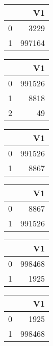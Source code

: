 \bigskip\bigskip
\centering
\begin{tabular}{rr}
  \hline
 & V1 \\ 
  \hline
0 & 3229 \\ 
  1 & 997164 \\ 
   \hline
\end{tabular}

\bigskip\bigskip
\centering
\begin{tabular}{rr}
  \hline
 & V1 \\ 
  \hline
0 & 991526 \\ 
  1 & 8818 \\ 
  2 &  49 \\ 
   \hline
\end{tabular}

\bigskip\bigskip
\centering
\begin{tabular}{rr}
  \hline
 & V1 \\ 
  \hline
0 & 991526 \\ 
  1 & 8867 \\ 
   \hline
\end{tabular}

\bigskip\bigskip
\centering
\begin{tabular}{rr}
  \hline
 & V1 \\ 
  \hline
0 & 8867 \\ 
  1 & 991526 \\ 
   \hline
\end{tabular}

\bigskip\bigskip
\centering
\begin{tabular}{rr}
  \hline
 & V1 \\ 
  \hline
0 & 998468 \\ 
  1 & 1925 \\ 
   \hline
\end{tabular}

\bigskip\bigskip
\centering
\begin{tabular}{rr}
  \hline
 & V1 \\ 
  \hline
0 & 1925 \\ 
  1 & 998468 \\ 
   \hline
\end{tabular}

